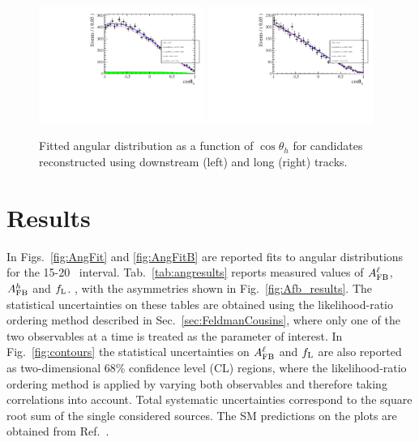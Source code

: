 %
\begin{figure}[h]
\centering
\includegraphics[width=0.48\textwidth]{Lmumu/figs/AngularDistribs/Fitted/AfbB_DD_jpsi.pdf}
\includegraphics[width=0.48\textwidth]{Lmumu/figs/AngularDistribs/Fitted/AfbB_LL_jpsi.pdf}
\caption{Fitted angular distribution as a function of $\cos\theta_h$ for \Lb\to\jpsi\Lz candidates
reconstructed using downstream (left) and long (right) tracks.  }
\label{fig:AngFitBJpsi}
\end{figure}







\section{Results}
\label{sec:afb_results}

In Figs.~\ref{fig:AngFit} and \ref{fig:AngFitB} are reported fits to angular distributions
for the 15-20 \gevgevcccc ~\qsq interval.
%
Tab.~\ref{tab:angresults} reports measured values of $A_{\rm FB}^\ell$, $A_{\rm FB}^h$ and $f_{\rm L}$.
, with the asymmetries shown in Fig.~\ref{fig:Afb_results}. The statistical uncertainties on these tables 
are obtained using the likelihood-ratio ordering method described in Sec.~\ref{sec:FeldmanCousins}, where only one of the two
observables at a time is treated as the parameter of interest. In Fig.~\ref{fig:contours} the statistical uncertainties
on $A_{\rm FB}^\ell$ and $f_{\rm L}$ are also reported as two-dimensional 68\;\% confidence level (CL) regions,
where the likelihood-ratio ordering method is applied by varying both observables and therefore taking
correlations into account. Total systematic uncertainties correspond to the square root sum of the
single considered sources. The SM predictions on the plots are obtained from Ref.~\cite{Detmold:2012vy}.  

